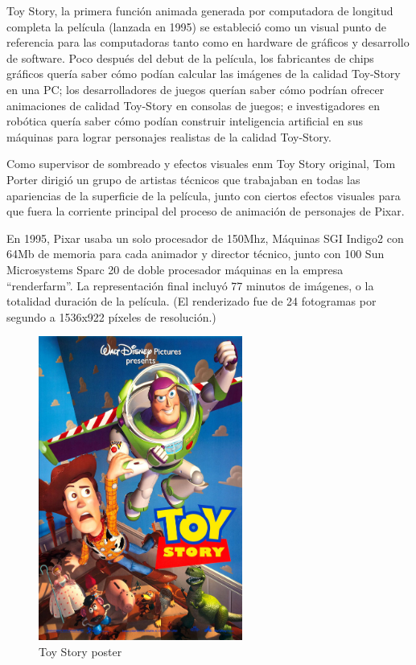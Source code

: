 \documentclass[a4paper,12pt]{report}
\begin{document}
 
Toy Story, la primera función animada generada por computadora de longitud completa
la película (lanzada en 1995) se estableció como un visual
punto de referencia para las computadoras tanto como en hardware de gráficos y desarrollo de software.
Poco después del debut de la película, los fabricantes de chips gráficos
quería saber cómo podían calcular las imágenes de la calidad Toy-Story en una PC; 
los desarrolladores de juegos querían saber cómo podrían ofrecer animaciones de calidad 
Toy-Story en consolas de juegos; e investigadores en robótica quería saber cómo podían construir inteligencia artificial
en sus máquinas para lograr personajes realistas de la calidad Toy-Story.
 
 
Como supervisor de sombreado y efectos visuales enm Toy Story original, Tom Porter dirigió un grupo de artistas técnicos 
que trabajaban en todas las apariencias de la superficie de la película, junto con ciertos efectos visuales para que fuera la corriente principal del proceso de animación de personajes de Pixar.
 
 
En 1995, Pixar usaba un solo procesador de 150Mhz,
Máquinas SGI Indigo2 con 64Mb de memoria para cada animador y  director técnico, junto con
100 Sun Microsystems Sparc 20 de doble procesador
máquinas en la empresa ``renderfarm''. La representación final incluyó 77 
minutos de imágenes, o la totalidad
duración de la película. (El renderizado fue de 24 fotogramas por
segundo a 1536x922 píxeles de resolución.)\cite{toy_story}
 
 
\begin{figure}[bt]
    \centering
    \includegraphics[height=10cm]{Imagenes/toy story}
    \caption{Toy Story poster}
    \label{fig:toy_story_poster}
\end{figure}
 
\end{document}

